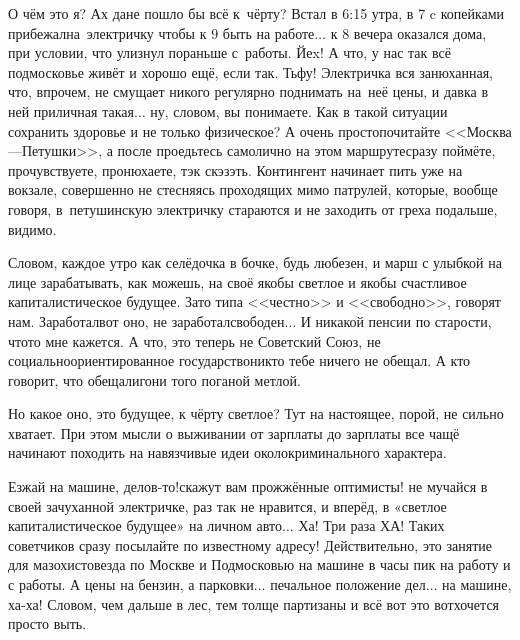 О чём это я? Ах да\mdash не пошло бы всё к~чёрту? Встал в 6:15 утра, в 7 c копейками прибежал\mdash на~электричку чтобы к 9 быть на работе$\ldots$ к 8 вечера оказался дома, при условии, что улизнул пораньше с~работы. Йеx! А что, у нас так всё подмосковье живёт и хорошо ещё, если так. Тьфу! Электричка вся занюханная, что, впрочем, не смущает никого регулярно поднимать на~неё цены, и давка в ней приличная такая$\ldots$ ну, словом, вы понимаете. Как в такой ситуации сохранить здоровье и не только физическое? А очень просто\mdash почитайте <<Москва\thinspace\nobreakdash---\thinspace Петушки>>\cite{МоскваПетушки}, а после проедьтесь самолично на этом маршруте\mdash сразу поймёте, прочувствуете, пронюхаете, тэк скэзэть. Контингент начинает пить уже на вокзале, совершенно не стесняясь проходящих мимо патрулей, которые, вообще говоря, в~петушинскую электричку стараются и не заходить от греха подальше, видимо.

Словом, каждое утро как селёдочка в бочке, будь любезен, и марш с улыбкой на лице зарабатывать, как можешь, на своё якобы светлое и якобы счастливое капиталистическое будущее. Зато типа <<честно>> и <<свободно>>, говорят нам. Заработал\mdash вот оно, не заработал\mdash свободен$\ldots$ И никакой пенсии по старости, что\sdash то мне кажется. А что, это теперь не Советский Союз, не социально\sdash ориентированное государство\mdash никто тебе ничего не обещал. А кто говорит, что обещали\mdash гони того поганой метлой.

Но какое оно, это будущее, к чёрту светлое? Тут на настоящее, порой, не сильно хватает. 
При этом мысли о выживании от зарплаты до зарплаты все чащё начинают походить на навязчивые идеи околокриминального характера.

\mdash Езжай на машине, делов-то!\mdash скажут вам прожжённые оптимисты! \mdash не мучайся в своей зачуханной электричке, раз так не нравится, и вперёд, в «светлое капиталистическое будущее» на личном авто$\ldots$ Ха! Три раза ХА! Таких советчиков сразу посылайте по известному адресу! Действительно, это занятие для мазохистов\mdash езда по Москве и Подмосковью на машине в часы пик на работу и с работы. А цены на бензин, а парковки$\ldots$ печальное положение дел$\ldots$ на машине, ха-ха! Словом, чем дальше в лес, тем толще партизаны и всё вот это вот\mdash хочется просто выть.

